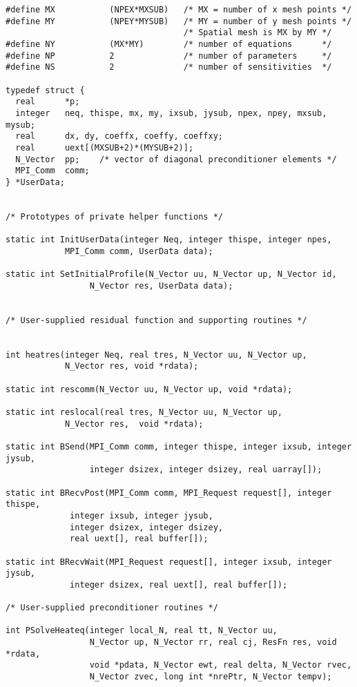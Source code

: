 \begin{verbatim}
#define MX           (NPEX*MXSUB)   /* MX = number of x mesh points */
#define MY           (NPEY*MYSUB)   /* MY = number of y mesh points */
                                    /* Spatial mesh is MX by MY */
#define NY           (MX*MY)        /* number of equations      */
#define NP           2              /* number of parameters     */
#define NS           2              /* number of sensitivities  */

typedef struct {  
  real      *p;
  integer   neq, thispe, mx, my, ixsub, jysub, npex, npey, mxsub, mysub;
  real      dx, dy, coeffx, coeffy, coeffxy;
  real      uext[(MXSUB+2)*(MYSUB+2)];
  N_Vector  pp;    /* vector of diagonal preconditioner elements */
  MPI_Comm  comm;
} *UserData;


/* Prototypes of private helper functions */

static int InitUserData(integer Neq, integer thispe, integer npes,
			MPI_Comm comm, UserData data);

static int SetInitialProfile(N_Vector uu, N_Vector up, N_Vector id,
			     N_Vector res, UserData data);


/* User-supplied residual function and supporting routines */


int heatres(integer Neq, real tres, N_Vector uu, N_Vector up,
            N_Vector res, void *rdata);

static int rescomm(N_Vector uu, N_Vector up, void *rdata);

static int reslocal(real tres, N_Vector uu, N_Vector up, 
		    N_Vector res,  void *rdata);

static int BSend(MPI_Comm comm, integer thispe, integer ixsub, integer jysub,
                 integer dsizex, integer dsizey, real uarray[]);

static int BRecvPost(MPI_Comm comm, MPI_Request request[], integer thispe,
		     integer ixsub, integer jysub,
		     integer dsizex, integer dsizey,
		     real uext[], real buffer[]);

static int BRecvWait(MPI_Request request[], integer ixsub, integer jysub,
		     integer dsizex, real uext[], real buffer[]);

/* User-supplied preconditioner routines */

int PSolveHeateq(integer local_N, real tt, N_Vector uu,
                 N_Vector up, N_Vector rr, real cj, ResFn res, void *rdata,
                 void *pdata, N_Vector ewt, real delta, N_Vector rvec,
                 N_Vector zvec, long int *nrePtr, N_Vector tempv);



\end{verbatim}

